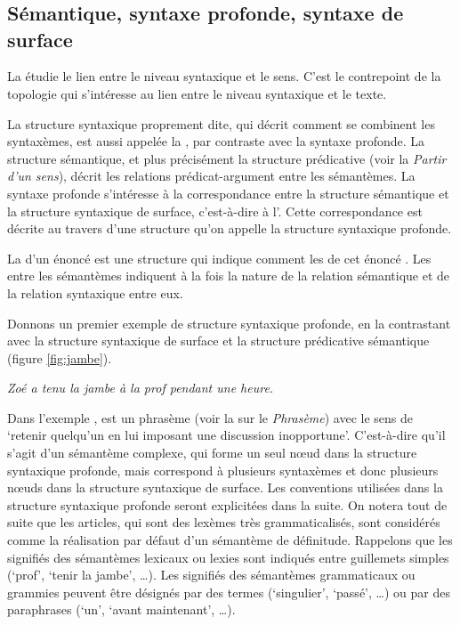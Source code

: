 \chapter{}\label{sec:13}

\section{Sémantique, syntaxe profonde, syntaxe de surface}

La  étudie le lien entre le niveau syntaxique et le sens. C’est le contrepoint de la topologie qui s’intéresse au lien entre le niveau syntaxique et le texte.

La structure syntaxique proprement dite, qui décrit comment se combinent les syntaxèmes, est aussi appelée la , par contraste avec la syntaxe profonde. La structure sémantique, et plus précisément la structure prédicative (voir la  \textit{Partir d’un sens}), décrit les relations prédicat-argument entre les sémantèmes. La syntaxe profonde s’intéresse à la correspondance entre la structure sémantique et la structure syntaxique de surface, c’est-à-dire à l’. Cette correspondance est décrite au travers d’une structure qu’on appelle la structure syntaxique profonde.

{La  d’un énoncé est une structure qui indique comment les  de cet énoncé . Les  entre les sémantèmes indiquent à la fois la nature de la relation sémantique et de la relation syntaxique entre eux.}

Donnons un premier exemple de structure syntaxique profonde, en la contrastant avec la structure syntaxique de surface et la structure prédicative sémantique (figure \ref{fig:jambe}). 

\ea\label{ex:jambe} \textit{Zoé a tenu la jambe à la prof pendant une heure.}\z

Dans l’exemple ,  est un phrasème (voir la  sur le \textit{Phrasème}) avec le sens de ‘retenir quelqu'un en lui imposant une discussion inopportune’. C’est-à-dire qu'il s'agit d'un sémantème complexe, qui forme un seul nœud dans la structure syntaxique profonde, mais correspond à plusieurs syntaxèmes et donc plusieurs nœuds dans la structure syntaxique de surface. Les conventions utilisées dans la structure syntaxique profonde seront explicitées dans la suite. On notera tout de suite que les articles, qui sont des lexèmes très grammaticalisés, sont considérés comme la réalisation par défaut d’un sémantème de définitude. Rappelons que les signifiés des sémantèmes lexicaux ou lexies sont indiqués entre guillemets simples (‘prof’, ‘tenir la jambe’, …). Les signifiés des sémantèmes grammaticaux ou grammies peuvent être désignés par des termes (‘singulier', ‘passé', …) ou par des paraphrases (‘un’, ‘avant maintenant’, …). 



